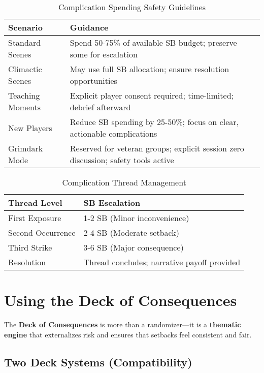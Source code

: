 \begin{table}[htbp]
\centering
\caption{Complication Spending Safety Guidelines}
\begin{tabular}{|p{3.5cm}|p{5.5cm}|}
\hline
\textbf{Scenario} & \textbf{Guidance} \\
\hline
Standard Scenes & Spend 50-75\% of available SB budget; preserve some for escalation \\
Climactic Scenes & May use full SB allocation; ensure resolution opportunities \\
Teaching Moments & Explicit player consent required; time-limited; debrief afterward \\
New Players & Reduce SB spending by 25-50\%; focus on clear, actionable complications \\
Grimdark Mode & Reserved for veteran groups; explicit session zero discussion; safety tools active \\
\hline
\end{tabular}
\end{table}

\begin{table}[htbp]
\centering
\caption{Complication Thread Management}
\begin{tabular}{|p{3cm}|p{6cm}|}
\hline
\textbf{Thread Level} & \textbf{SB Escalation} \\
\hline
First Exposure & 1-2 SB (Minor inconvenience) \\
Second Occurrence & 2-4 SB (Moderate setback) \\
Third Strike & 3-6 SB (Major consequence) \\
Resolution & Thread concludes; narrative payoff provided \\
\hline
\end{tabular}
\end{table}

\section*{Using the Deck of Consequences}

The \textbf{Deck of Consequences} is more than a randomizer---it is a \textbf{thematic engine} that externalizes risk and ensures that setbacks feel consistent and fair.

\subsection*{Two Deck Systems (Compatibility)}

